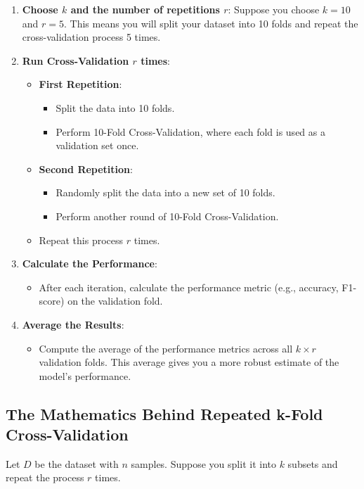 \documentclass[10pt]{article}
\begin{document}
\begin{enumerate}
    \item \textbf{Choose \(k\) and the number of repetitions \(r\)}: Suppose you choose \(k=10\) and \(r=5\). This means you will split your dataset into 10 folds and repeat the cross-validation process 5 times.
    \item \textbf{Run Cross-Validation \(r\) times}:
    \begin{itemize}
        \item \textbf{First Repetition}:
        \begin{itemize}
            \item Split the data into 10 folds.
            \item Perform 10-Fold Cross-Validation, where each fold is used as a validation set once.
        \end{itemize}
        \item \textbf{Second Repetition}:
        \begin{itemize}
            \item Randomly split the data into a new set of 10 folds.
            \item Perform another round of 10-Fold Cross-Validation.
        \end{itemize}
        \item Repeat this process \(r\) times.
    \end{itemize}
    \item \textbf{Calculate the Performance}:
    \begin{itemize}
        \item After each iteration, calculate the performance metric (e.g., accuracy, F1-score) on the validation fold.
    \end{itemize}
    \item \textbf{Average the Results}:
    \begin{itemize}
        \item Compute the average of the performance metrics across all \(k \times r\) validation folds. This average gives you a more robust estimate of the model’s performance.
    \end{itemize}
\end{enumerate}

\subsection{The Mathematics Behind Repeated k-Fold Cross-Validation}
Let \(D\) be the dataset with \(n\) samples. Suppose you split it into \(k\) subsets and repeat the process \(r\) times.
\end{document}
